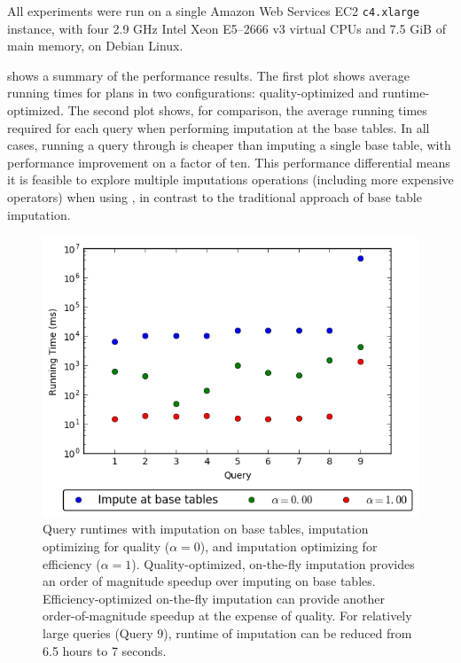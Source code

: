 %  

All experiments were run on a single Amazon Web Services EC2 {\tt c4.xlarge} instance, with
four 2.9 GHz Intel Xeon E5--2666 v3 virtual CPUs and 7.5 GiB of main memory, on Debian Linux.

 shows a summary of the performance results. The first plot
shows average running times for \ProjectName{} plans in two configurations:
quality-optimized and runtime-optimized. The second plot shows, for comparison, the average
running times required for each query when performing imputation at the base tables.  In all
cases, running a query through \ProjectName{} is cheaper than imputing a single base table,
with performance improvement on a factor of ten. This performance differential means it is feasible
to explore multiple imputations operations (including more expensive operators) when using
\ProjectName{}, in contrast to the traditional approach of base table imputation.

\begin{figure}
\includegraphics[width=\columnwidth]{figures/running_times_combined.png}
\caption{Query runtimes with imputation on base tables, \ProjectName{} imputation
    optimizing for quality ($\alpha=0$), and \ProjectName{} imputation optimizing for
    efficiency ($\alpha=1$). Quality-optimized, on-the-fly imputation provides an order of
    magnitude speedup over imputing on base tables. Efficiency-optimized on-the-fly
    imputation can provide another order-of-magnitude speedup at the expense of quality. For
    relatively large queries (Query 9), runtime of imputation can be reduced from 6.5
    hours to 7 seconds. }
\label{fig:runtimes}
\end{figure}

